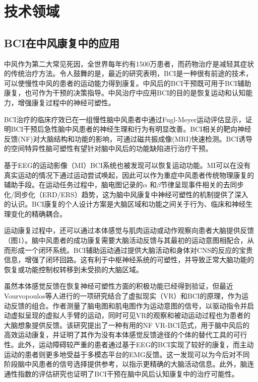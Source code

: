 \documentclass[UTF8,a4paper]{ctexart}
\begin{document}
\section{技术领域}
\subsection{BCI在中风康复中的应用}
中风作为第二大常见死因，全世界每年约有1500万患者\cite{members2017heart,bene2012interface}，而药物治疗是减轻其症状的传统治疗方法。令人鼓舞的是，最近的研究表明，BCI是一种很有前途的技术，可以使慢性中风的患者的运动能力得到康复\cite{song2014characterizing,song2015dti,muralidharan2011extracting}。中风后的BCI干预既可用于BCI辅助康复，也可作为干预的决策指导\cite{doi:10.1080/2326263X.2013.876724}。中风治疗中应用BCI的目的是恢复运动和认知能力，增强康复过程中的神经可塑性\cite{mcfarland2017therapeutic}。
\par
BCI治疗的临床疗效已在一组慢性脑中风患者中通过Fugl-Meyer运动评估显示\cite{mrachacz2016efficient}，证明BCI干预后急性脑中风患者的神经生理和行为有明显改善。BCI相关的靶向神经反馈(NF)对大脑结构和功能的影响，可通过磁共振成像(MRI)快速检测。BCI诱导的空间特异性脑可塑性有望针对脑中风后的功能缺陷进行治疗干预\cite{nierhaus2019immediate}。
\par
基于EEG的运动影像（MI）BCI系统也被发现可以恢复运动功能。MI可以在没有真实运动的情况下通过运动尝试唤起，因此可以作为重症中风患者传统物理康复的辅助手段\cite{crosbie2004adjunctive}。在运动任务过程中，脑电图记录的$\alpha$ 和$\beta$节律呈现事件相关的去同步化/同步化（ERD/ERS）趋势，这为脑中风康复中神经可塑性的机制提供了深入的认识\cite{carino2019longitudinal}。BCI康复的个人设计方案是大脑区域和功能之间关于行为、临床和神经生理变化的精确耦合。
\par
运动康复过程中，还可以通过本体感觉与肌肉运动或动作观察向患者大脑提供反馈（图1）。脑中风患者的成功康复需要大脑活动反馈与其最初的运动意图相配合，从而形成一个闭环系统。BCI辅助运动通过提供大脑活动和身体对CNS的反应的宝贵信息，增强了闭环回路。这有利于中枢神经系统的可塑性，并导致正常大脑功能的恢复或功能控制权转移到未受损的大脑区域\cite{doi:10.1080/2326263X.2013.876724}。
\par
虽然本体感觉反馈在恢复神经可塑性方面的积极功能已经得到验证，但最近Vourvopoulos等人进行的一项研究结合了虚拟现实（VR）和BCI的原理，作为运动反馈的组合\cite{vourvopoulos2019effects}。作者测量了脑电图和肌电图作为运动意图的信号，以驱动指令并启动虚拟呈现的虚拟人手臂的运动，同时可见VR的观察和被动运动过程也为患者的大脑想象提供反馈。该研究提出了一种有用的NF VR-BCI范式，用于脑中风后的高效运动康复，并证明了其作为没有本体感觉反馈途径的个体的替代工具的可行性。此外，运动障碍较严重的患者通过基于EEG的BCI实现了较好的康复，而主动运动的患者则更多地受益于多模态平台的EMG反馈。这一发现可以为今后对不同阶段脑中风患者的信号选择提供参考，以指示更精确的大脑活动信息。此外，脑连通性指数的评估研究也证明了BCI干预在脑中风后认知康复中的治疗可能性\cite{toppi2014time}。
\end{document}

